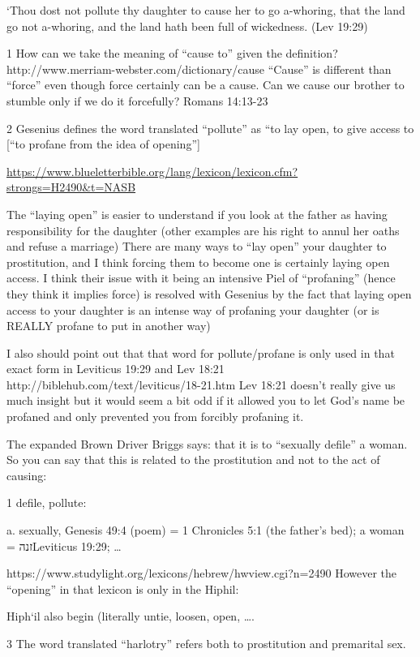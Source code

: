 \documentclass[11pt]{article}
\begin{document}
`Thou dost not pollute thy daughter to cause her to go a-whoring, that the land go not a-whoring, and the land hath been full of wickedness. (Lev 19:29)

1 How can we take the meaning of “cause to” given the definition? http://www.merriam-webster.com/dictionary/cause “Cause” is different than “force” even though force certainly can be a cause. Can we cause our brother to stumble only if we do it forcefully? Romans 14:13-23

2 Gesenius defines the word translated “pollute” as “to lay open, to give access to [“to profane from the idea of opening”]


\url{https://www.blueletterbible.org/lang/lexicon/lexicon.cfm?strongs=H2490&t=NASB}

The “laying open” is easier to understand if you look at the father as having responsibility for the daughter (other examples are his right to annul her oaths and refuse a marriage) There are many ways to “lay open” your daughter to prostitution, and I think forcing them to become one is certainly laying open access. I think their issue with it being an intensive Piel of “profaning” (hence they think it implies force) is resolved with Gesenius by the fact that laying open access to your daughter is an intense way of profaning your daughter (or is REALLY profane to put in another way)

I also should point out that that word for pollute/profane is only used in that exact form in Leviticus 19:29 and Lev 18:21
http://biblehub.com/text/leviticus/18-21.htm Lev 18:21 doesn’t really give us much insight but it would seem a bit odd if it allowed you to let God’s name be profaned and only prevented you from forcibly profaning it.

The expanded Brown Driver Briggs says: that it is to “sexually defile” a woman. So you can say that this is related to the prostitution and not to the act of causing:

1 defile, pollute:

a. sexually, Genesis 49:4 (poem) = 1 Chronicles 5:1 (the father’s bed); a woman = זנהLeviticus 19:29; …

https://www.studylight.org/lexicons/hebrew/hwview.cgi?n=2490﻿
However the “opening” in that lexicon is only in the Hiphil:

Hiph`il also begin (literally untie, loosen, open, ….

3 The word translated “harlotry” refers both to prostitution and premarital sex.
\end{document}

